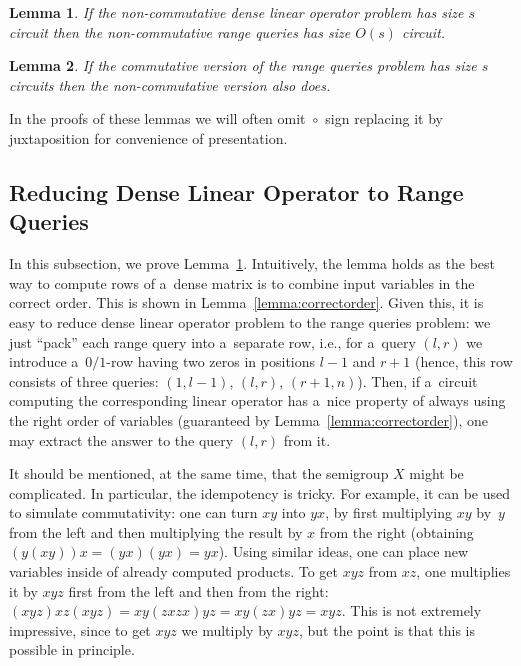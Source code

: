 \documentclass[11pt,letterpaper]{article}
\newtheorem{lemma}{Lemma}
\begin{document}
\begin{lemma} \label{lem:dense_matrices}
If the non-commutative dense linear operator problem has size $s$ circuit then the non-commutative range queries has size $O(s)$ circuit.
\end{lemma}

\begin{lemma} \label{lem:intervals}
If the commutative version of the range queries problem has size $s$ circuits then the non-commutative version also does.
\end{lemma}

In the proofs of these lemmas we will often omit~$\circ$~sign replacing it by juxtaposition for convenience of presentation.

\subsection{Reducing Dense Linear Operator to Range Queries}
In this subsection, we prove Lemma~\ref{lem:dense_matrices}. Intuitively, the lemma holds as the best way to compute rows of a~dense matrix is to combine input variables in the correct order. This is shown in Lemma~\ref{lemma:correctorder}. Given this, it is easy to reduce dense linear operator problem to the range queries problem: we just ``pack'' each range query into a~separate row, i.e., for a~query $(l,r)$ we introduce a~$0/1$-row having two zeros in positions $l-1$ and $r+1$ (hence, this row consists of three queries: $(1,l-1)$, $(l,r)$, $(r+1,n)$). Then, if a~circuit computing the corresponding linear operator has a~nice property of always using the right order of variables (guaranteed by Lemma~\ref{lemma:correctorder}), one may extract the answer to the query $(l,r)$ from it.

It should be mentioned, at the same time, that the semigroup $X$ might be complicated. In particular, the idempotency is tricky. For example, it can be used to simulate commutativity: one can turn $xy$ into $yx$, by first multiplying $xy$ by~$y$ from the left and then multiplying the result by $x$ from the right (obtaining $(y(xy))x=(yx)(yx)=yx$). Using similar ideas, one can place new variables inside of already computed products. To get $xyz$ from $xz$, one multiplies it by $xyz$ first from the left and then from the right: $(xyz)xz(xyz)=xy(zxzx)yz=xy(zx)yz=xyz$.
This is not extremely impressive, since to get $xyz$ we multiply by $xyz$, but the point is that this is possible in principle.
\end{document}
